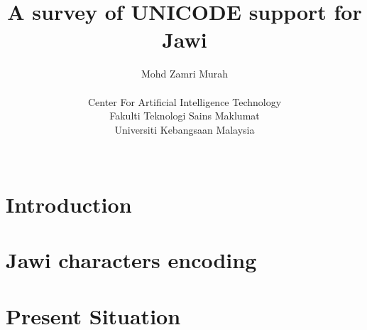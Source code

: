 \documentclass{IEEEconf}
\author{%
Mohd Zamri Murah \\
\begin{affiliation}
Center For Artificial Intelligence Technology \\
Fakulti Teknologi Sains Maklumat \\
Universiti Kebangsaan Malaysia
\end{affiliation} \\
\email{zamri@ftsm.ukm.my}
}
\title{A survey of UNICODE support for Jawi}
\begin{document}
	
\maketitle
	
\begin{abstract}
	\lipsum[1]
\end{abstract}





\section{Introduction}
\lipsum[2]

\lipsum[3]

\lipsum[4]
\section{Jawi characters encoding}

\lipsum[5]

\lipsum[6]

\lipsum[7]
\section{Present Situation}




\end{document}
